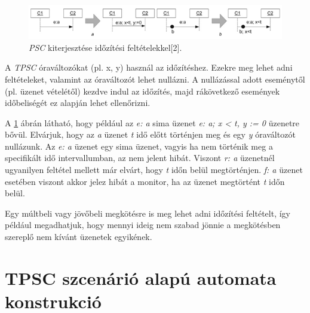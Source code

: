 \begin{figure}[!ht]
    \centering
    \includegraphics[width=150mm, keepaspectratio]{figures/4abra.png}
    \caption{\textit{PSC} kiterjesztése időzítési feltételekkel[2].}
    \label{psc_clock_improvement}
\end{figure}

A \textit{TPSC} óraváltozókat (pl. x, y) használ az időzítéshez.
Ezekre meg lehet adni feltételeket, valamint az óraváltozót lehet nullázni.
A nullázással adott eseménytől (pl. üzenet vételétől) kezdve indul az időzítés, majd rákövetkező események időbeliségét ez alapján lehet ellenőrizni.

A \ref{psc_clock_improvement} ábrán látható, hogy például az \textit{e: a} sima üzenet \textit{e: a; x < t, y := 0} üzenetre bővül.
Elvárjuk, hogy az \textit{a} üzenet \textit{t} idő előtt történjen meg és egy \textit{y} óraváltozót nullázunk.
Az \textit{e: a} üzenet egy sima üzenet, vagyis ha nem történik meg a specifikált idő intervallumban, az nem jelent hibát.
Viszont \textit{r: a} üzenetnél ugyanilyen feltétel mellett már elvárt, hogy \textit{t} időn belül megtörténjen. \textit{f: a} üzenet esetében viszont akkor jelez hibát a monitor, ha az üzenet megtörtént \textit{t} időn belül.

Egy múltbeli vagy jövőbeli megkötésre is meg lehet adni időzítési feltételt, így például megadhatjuk, hogy mennyi ideig nem szabad jönnie a megkötésben szereplő nem kívánt üzenetek egyikének.

\clearpage\section{TPSC szcenárió alapú automata konstrukció}

